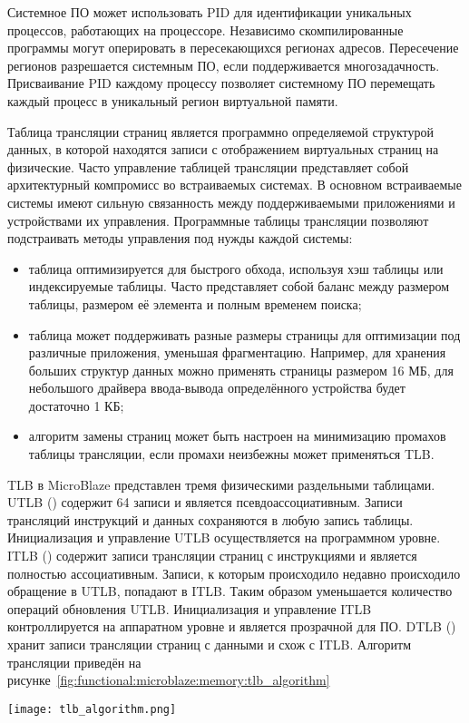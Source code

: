 Системное ПО может использовать PID для идентификации уникальных процессов, работающих
на процессоре. Независимо скомпилированные программы могут оперировать
в пересекающихся регионах адресов. Пересечение регионов разрешается
системным ПО, если поддерживается многозадачность. Присваивание PID каждому процессу
позволяет системному ПО перемещать каждый процесс в уникальный регион виртуальной
памяти.

Таблица трансляции страниц является программно определяемой структурой данных,
в которой находятся записи с отображением виртуальных страниц на физические. Часто
управление таблицей трансляции представляет собой архитектурный компромисс во встраиваемых
системах. В основном встраиваемые системы имеют сильную связанность между поддерживаемыми
приложениями и устройствами их управления. Программные таблицы трансляции позволяют подстраивать
методы управления под нужды каждой системы:
\begin{itemize}
  \item таблица оптимизируется для быстрого обхода, используя хэш таблицы или
    индексируемые таблицы. Часто представляет собой баланс между размером таблицы,
    размером её элемента и полным временем поиска;
  \item таблица может поддерживать разные размеры страницы для оптимизации под различные
    приложения, уменьшая фрагментацию. Например, для хранения больших структур данных
    можно применять страницы размером 16 МБ, для небольшого драйвера ввода-вывода определённого
    устройства будет достаточно 1 КБ;
  \item алгоритм замены страниц может быть настроен на минимизацию промахов таблицы трансляции,
    если промахи неизбежны может применяться TLB.
\end{itemize}

TLB в MicroBlaze представлен тремя физическими раздельными таблицами.
UTLB () содержит 64 записи и является псевдоассоциативным. Записи трансляций
инструкций и данных сохраняются в любую запись таблицы. Инициализация и управление UTLB
осуществляется на программном уровне. ITLB () содержит
записи трансляции страниц с инструкциями и является полностью ассоциативным. Записи, к которым
происходило недавно происходило обращение в UTLB, попадают в ITLB. Таким образом уменьшается
количество операций обновления UTLB. Инициализация и управление ITLB контроллируется на аппаратном
уровне и является прозрачной для ПО. DTLB () хранит записи трансляции страниц с
данными и схож с ITLB. Алгоритм трансляции приведён на рисунке~\ref{fig:functional:microblaze:memory:tlb_algorithm}
\begin{center}
  \centering
  \texttt{[image: tlb\_algorithm.png]}
  \label{fig:functional:microblaze:memory:tlb_algorithm}
\end{center}


